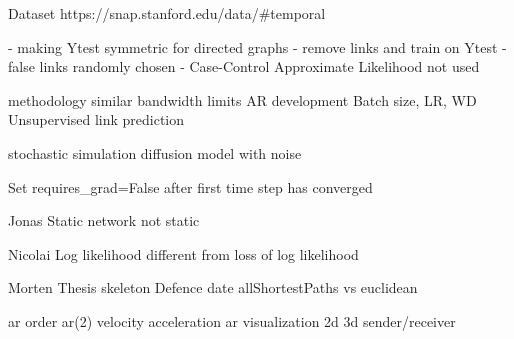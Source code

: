 Dataset https://snap.stanford.edu/data/#temporal

- making Ytest symmetric for directed graphs
- remove links and train on Ytest
- false links randomly chosen
- Case-Control Approximate Likelihood not used

methodology similar
bandwidth limits
AR development
Batch size, LR, WD
Unsupervised link prediction

stochastic simulation
diffusion model with noise

Set requires_grad=False after first time step has converged

Jonas
    Static network not static
    
Nicolai
    Log likelihood different from loss of log likelihood
    
Morten
    Thesis skeleton
    Defence date
    allShortestPaths vs euclidean


ar order
ar(2) velocity acceleration
ar visualization 2d 3d sender/receiver